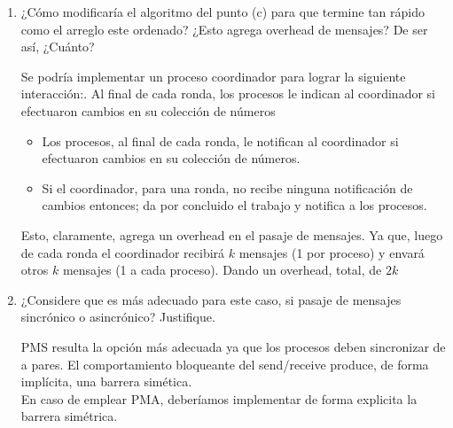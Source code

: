 \documentclass[a4paper, 10pt]{article}
\newenvironment{QandA}{
    \begin{enumerate}\bfseries}
    {\end{enumerate}
}
\newenvironment{answered}{\par\normalfont}{}
\begin{document}
\begin{QandA}
\begin{enumerate}[labelindent=0pt, align=left, leftmargin=0pt]
\item ¿Cómo modificaría el algoritmo del punto (c) para que termine tan rápido como el arreglo este ordenado? ¿Esto agrega overhead de mensajes? De ser así, ¿Cuánto?
\begin{answered}
Se podría implementar un proceso coordinador para lograr la siguiente interacción:. Al final de cada ronda, los procesos le indican al coordinador si efectuaron cambios en su colección de números
\begin{itemize}
    \item Los procesos, al final de cada ronda, le notifican al coordinador si efectuaron cambios en su colección de números.
    \item Si el coordinador, para una ronda, no recibe ninguna notificación de cambios entonces; da por concluido el trabajo y notifica a los procesos.
\end{itemize}
Esto, claramente, agrega un overhead en el pasaje de mensajes. Ya que, luego de cada ronda el coordinador recibirá $k$ mensajes (1 por proceso) y envará otros $k$ mensajes (1 a cada proceso). Dando un overhead, total, de $2k$
\end{answered}
\item ¿Considere que es más adecuado para este caso, si pasaje de mensajes sincrónico o asincrónico? Justifique.
\begin{answered}
PMS resulta la opción más adecuada ya que los procesos deben sincronizar de a pares. El comportamiento bloqueante del send/receive produce, de forma implícita, una barrera simética.
\\
En caso de emplear PMA, deberíamos implementar de forma explicita la barrera simétrica.
\end{answered}
\end{enumerate}



\end{QandA}
\end{document}
